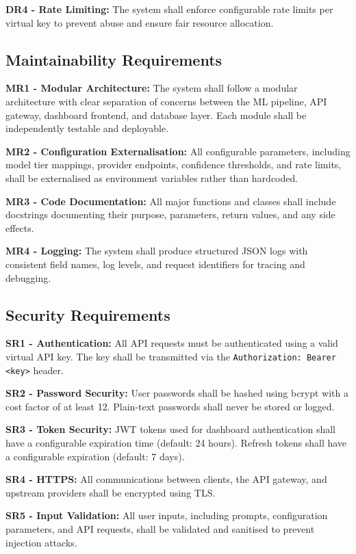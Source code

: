 \documentclass[oneside,12pt,a4paper]{report}
\begin{document}
\textbf{DR4 - Rate Limiting:} The system shall enforce configurable rate limits per virtual key to prevent abuse and ensure fair resource allocation.

\subsection{Maintainability Requirements}

\textbf{MR1 - Modular Architecture:} The system shall follow a modular architecture with clear separation of concerns between the ML pipeline, API gateway, dashboard frontend, and database layer. Each module shall be independently testable and deployable.

\textbf{MR2 - Configuration Externalisation:} All configurable parameters, including model tier mappings, provider endpoints, confidence thresholds, and rate limits, shall be externalised as environment variables rather than hardcoded.

\textbf{MR3 - Code Documentation:} All major functions and classes shall include docstrings documenting their purpose, parameters, return values, and any side effects.

\textbf{MR4 - Logging:} The system shall produce structured JSON logs with consistent field names, log levels, and request identifiers for tracing and debugging.

\subsection{Security Requirements}

\textbf{SR1 - Authentication:} All API requests must be authenticated using a valid virtual API key. The key shall be transmitted via the \texttt{Authorization: Bearer <key>} header.

\textbf{SR2 - Password Security:} User passwords shall be hashed using bcrypt with a cost factor of at least 12. Plain-text passwords shall never be stored or logged.

\textbf{SR3 - Token Security:} JWT tokens used for dashboard authentication shall have a configurable expiration time (default: 24 hours). Refresh tokens shall have a configurable expiration (default: 7 days).

\textbf{SR4 - HTTPS:} All communications between clients, the API gateway, and upstream providers shall be encrypted using TLS.

\textbf{SR5 - Input Validation:} All user inputs, including prompts, configuration parameters, and API requests, shall be validated and sanitised to prevent injection attacks.
\end{document}
